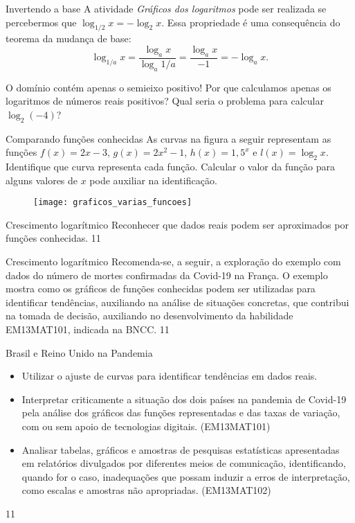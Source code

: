 \begin{observationtitle}{Invertendo a base}
A atividade \textit{Gráficos dos logaritmos} pode ser realizada se percebermos que $\log_{1/2} x = -\log_{2} x$. Essa propriedade é uma consequência do teorema da mudança de base:
$$
\log_{1/a} x = \frac{\log_a x}{\log_a {1/a}} = \frac{\log_a x}{-1} = -\log_a x. 
$$
\end{observationtitle}


\begin{reflection}{O domínio contém apenas o semieixo positivo!}
Por que calculamos apenas os logaritmos de números reais positivos? Qual seria o problema para calcular $\log_2 (-4)$?
\end{reflection}


\begin{task}{Comparando funções conhecidas}
As curvas na figura a seguir representam as funções $f(x) = 2x-3$, $g(x)=2x^2-1$, $h(x)=1{,}5^x$ e $l(x)=\log_2 x$. Identifique que curva representa cada função. Calcular o valor da função para alguns valores de $x$ pode auxiliar na identificação.

\begin{figure}[H]
\centering

\texttt{[image: graficos\_varias\_funcoes]}
\end{figure}

\end{task}

\clearpage
\begin{objectives}{Crescimento logarítmico}
{
	Reconhecer que dados reais podem ser aproximados por funções conhecidas.
}{1}{1}
\end{objectives}
\begin{sugestions}{Crescimento logarítmico}
{
	Recomenda-se, a seguir, a exploração do exemplo com dados do número de mortes confirmadas da Covid-19 na França. O exemplo mostra como os gráficos de funções conhecidas podem ser utilizadas para identificar tendências, auxiliando na análise de situações concretas, que contribui na tomada de decisão, auxiliando no desenvolvimento da habilidade EM13MAT101, indicada na BNCC.
}{1}{1}
\end{sugestions}

\begin{objectives}{Brasil e Reino Unido na Pandemia}
{
	\begin{itemize}
	\item Utilizar o ajuste de curvas para identificar tendências em dados reais.
	\item Interpretar criticamente a situação dos dois países na pandemia de Covid-19 pela análise dos gráficos das funções representadas e das taxas de variação, com ou sem apoio de tecnologias digitais. (EM13MAT101)
	\item Analisar tabelas, gráficos e amostras de pesquisas estatísticas apresentadas em relatórios divulgados por diferentes meios de comunicação, identificando, quando for o caso, inadequações que possam induzir a erros de interpretação, como escalas e amostras não apropriadas. (EM13MAT102)
	\end{itemize}
}{1}{1}
\end{objectives}

